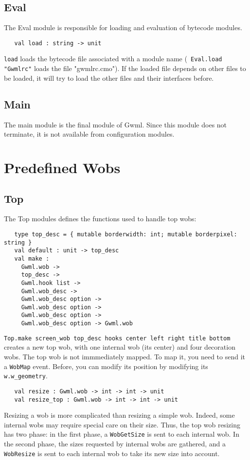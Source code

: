 \documentclass{book}
\begin{document}
   \subsection{\bf Eval}

  The Eval module is responsible for loading and evaluation of bytecode modules.

\begin{verbatim}
   val load : string -> unit
\end{verbatim}
  {\tt load} loads the bytecode file associated with a module name ({\tt 
Eval.load "Gwmlrc"} loads the file "gwmlrc.cmo"). If the loaded file 
depends on other files to be loaded, it will try to load the other files 
and their interfaces before.

   \subsection{\bf Main}
 
  The main module is the final module of Gwml. Since this module does not
terminate, it is not available from configuration modules.

\section{Predefined Wobs}

   \subsection{\bf Top}

  The Top modules defines the functions used to handle top wobs:

\begin{verbatim}
   type top_desc = { mutable borderwidth: int; mutable borderpixel: string }
   val default : unit -> top_desc
   val make :
     Gwml.wob ->
     top_desc ->
     Gwml.hook list ->
     Gwml.wob_desc ->
     Gwml.wob_desc option ->
     Gwml.wob_desc option ->
     Gwml.wob_desc option -> 
     Gwml.wob_desc option -> Gwml.wob
\end{verbatim}

  {\tt Top.make screen\_wob top\_desc hooks center left right title bottom}
 creates a new top wob, with one internal wob (its center) and four 
decoration wobs. The top wob is not immmediately mapped. To map it, you 
need to send it a {\tt WobMap} event. Before, you can modify its position 
by modifying its {\tt w.w\_geometry}. 

\begin{verbatim}
   val resize : Gwml.wob -> int -> int -> unit
   val resize_top : Gwml.wob -> int -> int -> unit
\end{verbatim}
  Resizing a wob is more complicated than resizing a simple wob. Indeed, 
some internal wobs may require special care on their size. Thus, the top 
wob resizing has two phase: in the first phase, a {\tt WobGetSize} is sent 
to each internal wob. In the second phase, the sizes requested by internal 
wobs are gathered, and a {\tt WobResize} is sent to each internal wob to 
take its new size into account.
\end{document}
